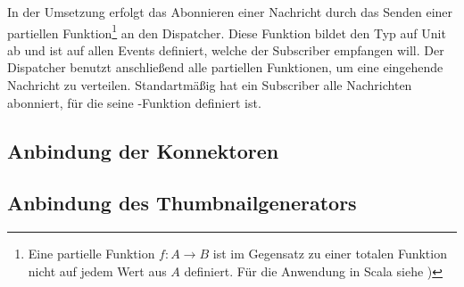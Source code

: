 In der Umsetzung erfolgt das Abonnieren einer Nachricht durch das Senden einer partiellen Funktion\footnote{Eine partielle Funktion $f: A \rightarrow B$ ist im Gegensatz zu einer totalen Funktion nicht auf jedem Wert aus $A$ definiert. Für die Anwendung in Scala siehe \cite{partial-function})} an den Dispatcher. Diese Funktion bildet den Typ  auf Unit ab und ist auf allen Events definiert, welche der Subscriber empfangen will. Der Dispatcher benutzt anschließend alle partiellen Funktionen, um eine eingehende Nachricht zu verteilen. Standartmäßig hat ein Subscriber alle Nachrichten abonniert, für die seine -Funktion definiert ist.

\subsection{Anbindung der Konnektoren}

\subsection{Anbindung des Thumbnailgenerators}

